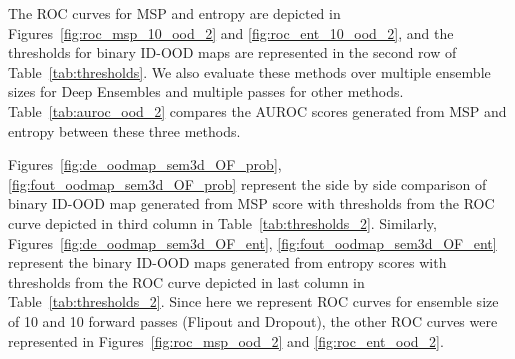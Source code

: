     The ROC curves for MSP and entropy are depicted in Figures~\ref{fig:roc_msp_10_ood_2} and \ref{fig:roc_ent_10_ood_2}, and the thresholds for binary ID-OOD maps are represented in the second row of Table~\ref{tab:thresholds}.
    We also evaluate these methods over multiple ensemble sizes for Deep Ensembles and multiple passes for other methods.
    Table~\ref{tab:auroc_ood_2} compares the AUROC scores generated from MSP and entropy between these three methods.
    
    Figures~\ref{fig:de_oodmap_sem3d_OF_prob}, \ref{fig:fout_oodmap_sem3d_OF_prob} represent the side by side comparison of binary ID-OOD map generated from MSP score with thresholds from the ROC curve depicted in third column in Table~\ref{tab:thresholds_2}.
    Similarly, Figures~\ref{fig:de_oodmap_sem3d_OF_ent}, \ref{fig:fout_oodmap_sem3d_OF_ent} represent the binary ID-OOD maps generated from entropy scores with thresholds from the ROC curve depicted in last column in Table~\ref{tab:thresholds_2}.
    Since here we represent ROC curves for ensemble size of 10 and 10 forward passes (Flipout and Dropout), the other ROC curves were represented in Figures~\ref{fig:roc_msp_ood_2} and \ref{fig:roc_ent_ood_2}.

